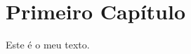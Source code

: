 \documentclass[11pt]{memoir}
\begin{document}
\renewcommand{\chaptitlefont}{%
  \normalfont\Huge\bfseries\singlespace}

\chapter{Primeiro Capítulo}

Este é o meu texto.
\end{document}
